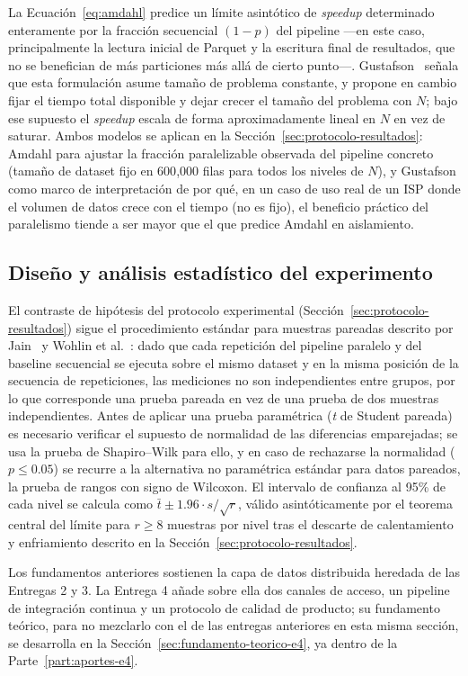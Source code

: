 La Ecuación~\ref{eq:amdahl} predice un límite asintótico de \emph{speedup} determinado
enteramente por la fracción secuencial $(1-p)$ del pipeline —en este caso, principalmente la
lectura inicial de Parquet y la escritura final de resultados, que no se benefician de más
particiones más allá de cierto punto—. Gustafson~\cite{gustafson1988reevaluating} señala que esta
formulación asume tamaño de problema constante, y propone en cambio fijar el tiempo total
disponible y dejar crecer el tamaño del problema con $N$; bajo ese supuesto el \emph{speedup}
escala de forma aproximadamente lineal en $N$ en vez de saturar. Ambos modelos se aplican en la
Sección~\ref{sec:protocolo-resultados}: Amdahl para ajustar la fracción paralelizable observada
del pipeline concreto (tamaño de dataset fijo en 600{,}000 filas para todos los niveles de $N$),
y Gustafson como marco de interpretación de por qué, en un caso de uso real de un ISP donde el
volumen de datos crece con el tiempo (no es fijo), el beneficio práctico del paralelismo tiende a
ser mayor que el que predice Amdahl en aislamiento.

\subsection{Diseño y análisis estadístico del experimento}

El contraste de hipótesis del protocolo experimental (Sección~\ref{sec:protocolo-resultados})
sigue el procedimiento estándar para muestras pareadas descrito por Jain~\cite{jain1991art} y
Wohlin et al.~\cite{wohlin2012experimentation}: dado que cada repetición del pipeline paralelo y
del baseline secuencial se ejecuta sobre el mismo dataset y en la misma posición de la secuencia
de repeticiones, las mediciones no son independientes entre grupos, por lo que corresponde una
prueba pareada en vez de una prueba de dos muestras independientes. Antes de aplicar una prueba
paramétrica (\emph{t} de Student pareada) es necesario verificar el supuesto de normalidad de las
diferencias emparejadas; se usa la prueba de Shapiro–Wilk para ello, y en caso de rechazarse la
normalidad ($p \leq 0.05$) se recurre a la alternativa no paramétrica estándar para datos
pareados, la prueba de rangos con signo de Wilcoxon. El intervalo de confianza al 95\% de cada
nivel se calcula como $\bar{t} \pm 1.96 \cdot s/\sqrt{r}$, válido asintóticamente por el teorema
central del límite para $r \geq 8$ muestras por nivel tras el descarte de calentamiento y
enfriamiento descrito en la Sección~\ref{sec:protocolo-resultados}.

\bigskip
\noindent
Los fundamentos anteriores sostienen la capa de datos distribuida heredada de las Entregas 2 y 3.
La Entrega 4 añade sobre ella dos canales de acceso, un pipeline de integración continua y un
protocolo de calidad de producto; su fundamento teórico, para no mezclarlo con el de las entregas
anteriores en esta misma sección, se desarrolla en la Sección~\ref{sec:fundamento-teorico-e4}, ya
dentro de la Parte~\ref{part:aportes-e4}.
